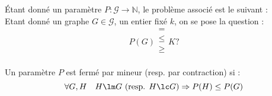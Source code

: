 \documentclass[a4paper, 11pt]{thesis}
\begin{document}
\begin{df}
    Étant donné un paramètre $P : \mathcal{G} \longrightarrow \mathbb{N}$, le problème associé est
    le suivant : \\
    Etant donné un graphe $G \in \mathcal{G}$, un entier fixé $k$, on se pose la question :
    \begin{displaymath}
        P(G) \left . \begin{array}{c}
            = \\ \leq \\ \geq \\
        \end{array}
        \right .
        K ?
    \end{displaymath}
\end{df}

\begin{df}
    Un paramètre $P$ est fermé par mineur (resp. par contraction) si :
    \begin{displaymath}
        \forall G, H \quad H \lm G\ (\mbox{resp. } H \lc G) \Rightarrow P(H) \leq P(G)
    \end{displaymath}
\end{df}


\end{document}
